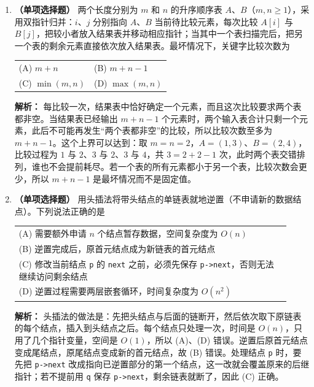 \begin{enumerate}[resume]

\item \textbf{（单项选择题）} 两个长度分别为 $m$ 和 $n$ 的升序顺序表 $A$、$B$（$m,n\geqslant 1$），采用双指针归并：$i$、$j$ 分别指向 $A$、$B$ 当前待比较元素，每次比较 $A[i]$ 与 $B[j]$，把较小者放入结果表并移动相应指针；当其中一个表扫描完后，把另一个表的剩余元素直接依次放入结果表。最坏情况下，关键字比较次数为

\begin{center}
\begin{tabular}{ll}
(A) $m+n$ & (B) $m+n-1$ \\[6pt]
(C) $\min(m,n)$ & (D) $\max(m,n)$
\end{tabular}
\end{center}

\ifshowsolutions\par\noindent\textbf{解析：} 每比较一次，结果表中恰好确定一个元素，而且这次比较要求两个表都非空。当结果表已经输出 $m+n-1$ 个元素时，两个输入表合计只剩一个元素，此后不可能再发生“两个表都非空”的比较，所以比较次数至多为 $m+n-1$。这个上界可以达到：取 $m=n=2$，$A=(1,3)$、$B=(2,4)$，比较过程为 $1$ 与 $2$、$3$ 与 $2$、$3$ 与 $4$，共 $3=2+2-1$ 次，此时两个表交错排列，谁也不会提前耗尽。若一个表的所有元素都小于另一个表，比较次数会更少，所以 $m+n-1$ 是最坏情况而不是固定值。\else \answerarea \fi

\item \textbf{（单项选择题）} 用头插法将带头结点的单链表就地逆置（不申请新的数据结点）。下列说法正确的是

\begin{center}
\begin{tabular}{p{0.92\linewidth}}
(A) 需要额外申请 $n$ 个结点暂存数据，空间复杂度为 $O(n)$ \\[4pt]
(B) 逆置完成后，原首元结点成为新链表的首元结点 \\[4pt]
(C) 修改当前结点 \texttt{p} 的 \texttt{next} 之前，必须先保存 \texttt{p->next}，否则无法继续访问剩余结点 \\[4pt]
(D) 逆置过程需要两层嵌套循环，时间复杂度为 $O(n^2)$ \\
\end{tabular}
\end{center}

\ifshowsolutions\par\noindent\textbf{解析：} 头插法的做法是：先把头结点与后面的链断开，然后依次取下原链表的每个结点，插入到头结点之后。每个结点只处理一次，时间是 $O(n)$，只用了几个指针变量，空间是 $O(1)$，所以 (A)、(D) 错误。逆置后原首元结点变成尾结点，原尾结点变成新的首元结点，故 (B) 错误。处理结点 \texttt{p} 时，要先把 \texttt{p->next} 改成指向已逆置部分的第一个结点，这一改就会覆盖原来的后继指针；若不提前用 \texttt{q} 保存 \texttt{p->next}，剩余链表就断了，因此 (C) 正确。\else \answerarea \fi


\end{enumerate}
